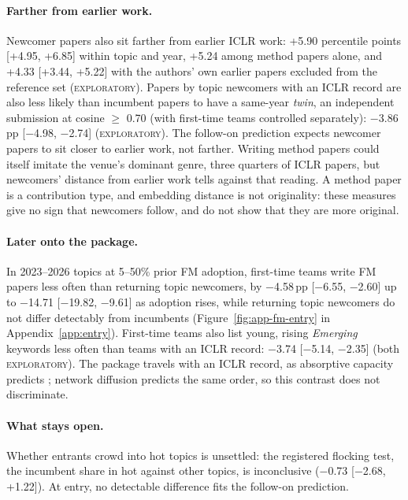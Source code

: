 \documentclass[11pt]{article}
\newcommand{\lab}[1]{\textsc{#1}}
\begin{document}
\paragraph{Farther from earlier work.}
Newcomer papers also sit farther from earlier ICLR work: +5.90 percentile points [+4.95, +6.85] within topic and
year, +5.24 among method papers alone, and +4.33 [+3.44, +5.22] with the authors' own earlier papers excluded from
the reference set (\lab{exploratory}). Papers by topic newcomers with an ICLR record are also less
likely than incumbent papers to have a same-year \emph{twin}, an independent submission at cosine $\geq$ 0.70 (with
first-time teams controlled separately): $-$3.86\,pp [$-$4.98, $-$2.74] (\lab{exploratory}).
The follow-on prediction expects newcomer papers to sit closer to earlier work, not farther. Writing method papers
could itself imitate the venue's dominant genre, three quarters of ICLR papers, but newcomers' distance from earlier
work tells against that reading. A method paper is a contribution type, and embedding distance is not originality:
these measures give no sign that newcomers follow, and do not show that they are more original.

\paragraph{Later onto the package.}
In 2023--2026 topics at 5--50\% prior FM adoption, first-time teams write FM papers less often than returning topic
newcomers, by $-$4.58\,pp [$-$6.55, $-$2.60] up to $-$14.71 [$-$19.82, $-$9.61] as adoption rises, while returning
topic newcomers do not differ detectably from incumbents (Figure~\ref{fig:app-fm-entry} in Appendix~\ref{app:entry}). First-time teams also list
young, rising \emph{Emerging} keywords less often than teams with an ICLR record: $-$3.74 [$-$5.14, $-$2.35] (both
\lab{exploratory}). The package travels with an ICLR record, as absorptive
capacity predicts \citep{cohen1990absorptive}; network diffusion predicts the same order, so this contrast does not
discriminate.

\paragraph{What stays open.}
Whether entrants crowd into hot topics is unsettled: the registered flocking test, the incumbent share in hot
against other topics, is inconclusive ($-$0.73 [$-$2.68, +1.22]). At entry, no detectable difference fits the
follow-on prediction.
\end{document}
